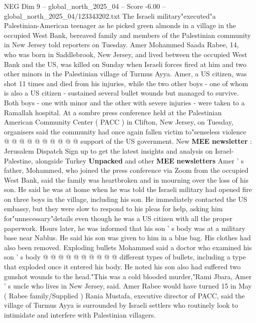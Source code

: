 \begin{textsample}{NEG Dim 9 – global\_north\_2025\_04 – Score -6.00 – global\_north\_2025\_04/123343202.txt}  \label{ex:f9_neg_031}
The Israeli military"executed"a Palestinian-American teenager as he picked green almonds in a village in the occupied West Bank, bereaved family and members of the Palestinian community in New Jersey told reporters on Tuesday.
Amer Mohammed Saada Rabee, 14, who was born in Saddlebrook, New Jersey, and lived between the occupied West Bank and the US, was killed on Sunday when Israeli forces fired at him and two other minors in the Palestinian village of Turmus Ayya.
Amer, a US citizen, was shot 11 times and died from his injuries, while the two other boys - one of whom is also a US citizen - sustained several bullet wounds but managed to survive.
Both boys - one with minor and the other with severe injuries - were taken to a Ramallah hospital.
At a sombre press conference held at the Palestinian American Community Center ( PACC ) in Clifton, New Jersey, on Tuesday, organisers said the community had once again fallen victim to"senseless violence @ @ @ @ @ @ @ @ @ @ support of the US government.
New \textbf{MEE} \textbf{newsletter} : Jerusalem Dispatch Sign up to get the latest insights and analysis on Israel-Palestine, alongside Turkey \textbf{Unpacked} and other \textbf{MEE} \textbf{newsletters} Amer ' s father, Mohammed, who joined the press conference via Zoom from the occupied West Bank, said the family was heartbroken and in mourning over the loss of his son.
He said he was at home when he was told the Israeli military had opened fire on three boys in the village, including his son.
He immediately contacted the US embassy, but they were slow to respond to his pleas for help, asking him for"unnecessary"details even though he was a US citizen with all the proper paperwork.
Hours later, he was informed that his son ' s body was at a military base near Nablus.
He said his son was given to him in a blue bag.
His clothes had also been removed.
Exploding bullets Mohammed said a doctor who examined his son ' s body @ @ @ @ @ @ @ @ @ @ different types of bullets, including a type that exploded once it entered his body.
He noted his son also had suffered two gunshot wounds to the head."This was a cold blooded murder,"Rami Jbara, Amer ' s uncle who lives in New Jersey, said.
Amer Rabee would have turned 15 in May ( Rabee family/Supplied ) Rania Mustafa, executive director of PACC, said the village of Turmus Ayya is surrounded by Israeli settlers who routinely look to intimidate and interfere with Palestinian villagers.

\end{textsample}
